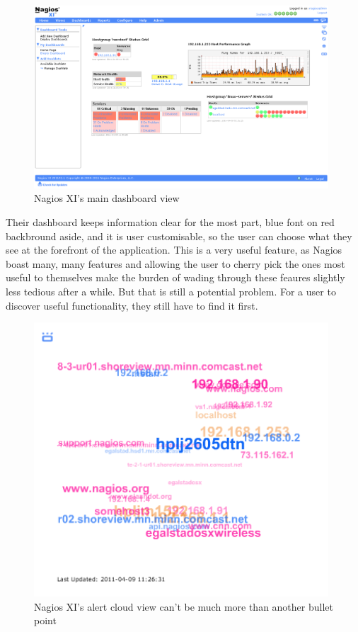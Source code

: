 \documentclass{l3proj}
\begin{document}
\begin{figure}[H]
\centering
\includegraphics[width=110mm]{Competitors/NagiosXI_dashboard1.png}
\caption{Nagios XI's main dashboard view}
\end{figure}

Their dashboard keeps information clear for the most part, blue font on red backbround aside, and it is user customisable, so the user can choose what they see at the forefront of the application. This is a very useful feature, as Nagios boast many, many features and allowing the user to cherry pick the ones most useful to themselves make the burden of wading through these feaures slightly less tedious after a while. But that is still a potential problem. For a user to discover useful functionality, they still have to find it first.

\begin{figure}[H]
\centering
\includegraphics[width=110mm]{Competitors/NagiosXI_alertcloud.png}
\caption{Nagios XI's alert cloud view can't be much more than another bullet point}
\label{fig:NagiosAlertCloud}
\end{figure}
\end{document}
